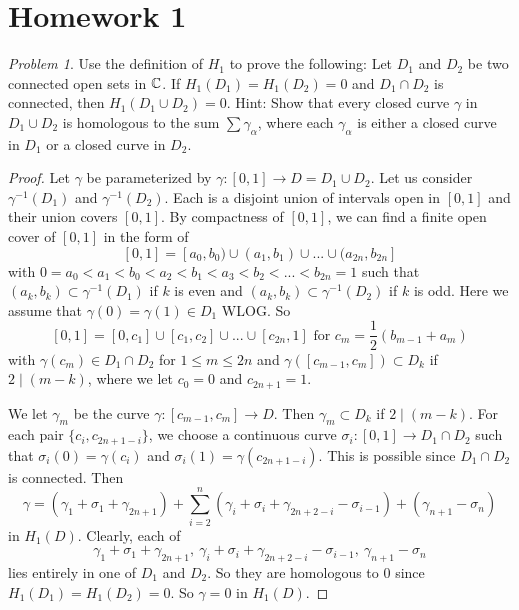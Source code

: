 \documentclass[11pt]{amsart}
\theoremstyle{remark}
\newtheorem{prob}{Problem}[section]
\theoremstyle{definition}
\numberwithin{equation}{section}
\begin{document}
\section{Homework 1}

\begin{prob}
    Use the definition of $H_1$ to prove the following: Let $D_1$ and $D_2$ be two connected open sets in ${\mathbb C}$. If $H_1(D_1) = H_1(D_2) = 0$ and
    $D_1\cap D_2$ is connected, then $H_1(D_1\cup D_2) = 0$.
    Hint: Show that every closed curve $\gamma$ in $D_1\cup D_2$ is homologous to the sum
    $\sum \gamma_\alpha$, where each $\gamma_\alpha$ is either a closed curve in $D_1$ or a closed curve in $D_2$.
\end{prob}

\begin{proof}
    Let $\gamma$ be parameterized by $\gamma: [0,1]\to D = D_1\cup D_2$.
    Let us consider $\gamma^{-1}(D_1)$ and $\gamma^{-1}(D_2)$. Each is a disjoint union of intervals open in $[0,1]$ and their union covers $[0,1]$. By compactness of $[0,1]$, we can find a finite open cover of $[0,1]$ in the form of
    \[
        [0,1] = [a_0, b_0) \cup (a_1, b_1) \cup ... \cup (a_{2n}, b_{2n}]
    \]
    with $0 = a_0 < a_1 < b_0 < a_2 < b_1 < a_3 < b_2 < ... < b_{2n}=1$ such that $(a_k, b_k)\subset \gamma^{-1}(D_1)$ if $k$ is even and $(a_k,b_k) \subset \gamma^{-1}(D_2)$ if $k$ is odd. Here we assume that $\gamma(0) = \gamma(1)\in D_1$ WLOG. So
    \[
        [0,1] = [0,c_1] \cup [c_1, c_2]\cup ... \cup [c_{2n}, 1]
        \text{ for } c_m = \frac{1}2(b_{m-1} + a_m)
    \]
    with $\gamma(c_m)\in D_1\cap D_2$ for $1\le m \le 2n$ and $\gamma([c_{m-1}, c_m])\subset D_k$ if $2\mid (m-k)$, where we let $c_0=0$ and $c_{2n+1} = 1$.

    We let $\gamma_m$ be the curve $\gamma: [c_{m-1}, c_m]\to D$. Then $\gamma_m\subset D_k$ if $2\mid (m-k)$. For each pair $\{c_i, c_{2n+1-i}\}$, we choose a continuous curve $\sigma_i: [0,1]\to D_1\cap D_2$ such that $\sigma_i(0) = \gamma(c_i)$ and $\sigma_i(1) = \gamma(c_{2n+1-i})$. This is possible since $D_1\cap D_2$ is connected. Then
    \[
        \gamma = (\gamma_1 + \sigma_1 + \gamma_{2n+1}) +
        \sum_{i=2}^{n}
        (\gamma_i + \sigma_{i} + \gamma_{2n+2-i} - \sigma_{i-1})
        + (\gamma_{n+1} - \sigma_n)
    \]
    in $H_1(D)$. Clearly, each of
    \[
        \gamma_1 + \sigma_1 + \gamma_{2n+1},\ \gamma_i + \sigma_{i} + \gamma_{2n+2-i} - \sigma_{i-1},\ \gamma_{n+1} - \sigma_n
    \]
    lies entirely in one of $D_1$ and $D_2$. So they are homologous to $0$ since $H_1(D_1) = H_1(D_2) = 0$. So $\gamma = 0$ in $H_1(D)$.
\end{proof}
\end{document}
